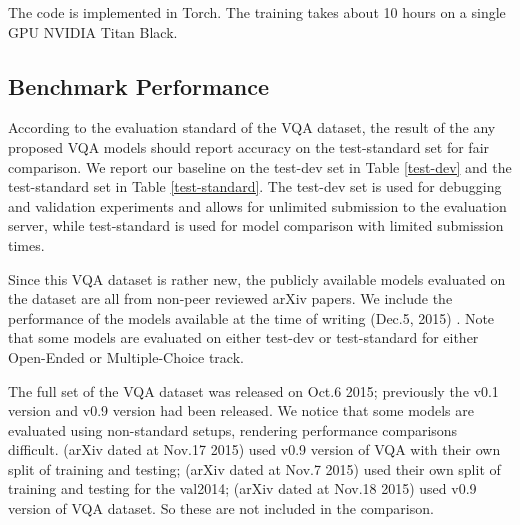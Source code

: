 \documentclass{article} \usepackage{nips14submit_e,times}
\begin{document}
The code is implemented in Torch. The training takes about 10 hours on a single GPU NVIDIA Titan Black.





\subsection{Benchmark Performance}

According to the evaluation standard of the VQA dataset, the result of the any proposed VQA models should report accuracy on the test-standard set for fair comparison. We report our baseline on the test-dev set in Table \ref{test-dev} and the test-standard set in Table \ref{test-standard}. The test-dev set is used for debugging and validation experiments and allows for unlimited submission to the evaluation server, while test-standard is used for model comparison with limited submission times.

Since this VQA dataset is rather new, the publicly available models evaluated on the dataset are all from non-peer reviewed arXiv papers. We include the performance of the models available at the time of writing (Dec.5, 2015) \cite{antol2015vqa, jiang2015compositional, andreas2015deep, shih2015look,wu2015ask,noh2015image}. Note that some models are evaluated on either test-dev or test-standard for either Open-Ended or Multiple-Choice track. 

The full set of the VQA dataset was released on Oct.6 2015;  previously the v0.1 version and v0.9 version had been released. We notice that some models are evaluated using non-standard setups, rendering performance comparisons difficult. \cite{xu2015ask} (arXiv dated at Nov.17 2015) used v0.9 version of VQA with their own split of training and testing; \cite{yang2015stacked} (arXiv dated at Nov.7 2015) used their own split of training and testing for the val2014; \cite{chen2015abc} (arXiv dated at Nov.18 2015) used v0.9 version of VQA dataset. So these are not included in the comparison.
\end{document}
